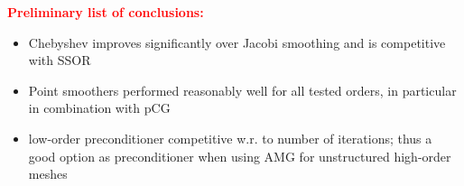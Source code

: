 \documentclass[smallcondensed,final]{svjour3}     %
\newcommand{\todo}[1]{\textcolor{red}{\bf #1}}
\newcommand{\gsnote}[1]{\textcolor{blue}{GS: #1}}
\begin{document}
\todo{Preliminary list of conclusions:}
\begin{itemize}
\item Chebyshev improves significantly over Jacobi smoothing and is
  competitive with SSOR
\item Point smoothers performed reasonably well for all tested orders,
  in particular in combination with pCG
\item low-order preconditioner competitive w.r. to number of
  iterations; thus a good option as preconditioner when using AMG for
  unstructured high-order meshes

\end{itemize}




\end{document}
